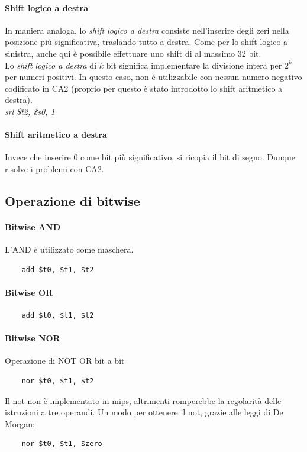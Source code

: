 \documentclass[class=book, crop=false]{standalone}
\begin{document}
\paragraph{Shift logico a destra}
In maniera analoga, lo \emph{shift logico a destra} consiste nell'inserire degli zeri nella posizione più significativa, traslando tutto a destra. Come per lo shift logico a sinistra, anche qui è possibile effettuare uno shift di al massimo 32 bit.\\
Lo \emph{shift logico a destra} di \(k\) bit significa implementare la divisione intera per \(2^k\) per numeri positivi. In questo caso, non è utilizzabile con nessun numero negativo codificato in CA2 (proprio per questo è stato introdotto lo shift aritmetico a destra).\\
\emph{srl \$t2, \$s0, 1}

\paragraph{Shift aritmetico a destra}
Invece che inserire 0 come bit più significativo, si ricopia il bit di segno. Dunque risolve i problemi con CA2.


\subsection{Operazione di bitwise}
\paragraph{Bitwise AND}
L'AND è utilizzato come maschera.\\
\begin{verbatim}
	add $t0, $t1, $t2
\end{verbatim}

\paragraph{Bitwise OR}
\begin{verbatim}
	add $t0, $t1, $t2
\end{verbatim}

\paragraph{Bitwise NOR}
Operazione di NOT OR bit a bit\\
\begin{verbatim}
	nor $t0, $t1, $t2
\end{verbatim}
Il not non è implementato in mips, altrimenti romperebbe la regolarità delle istruzioni a tre operandi. Un modo per ottenere il not, grazie alle leggi di De Morgan:\\
\begin{verbatim}
	nor $t0, $t1, $zero
\end{verbatim}
\end{document}
